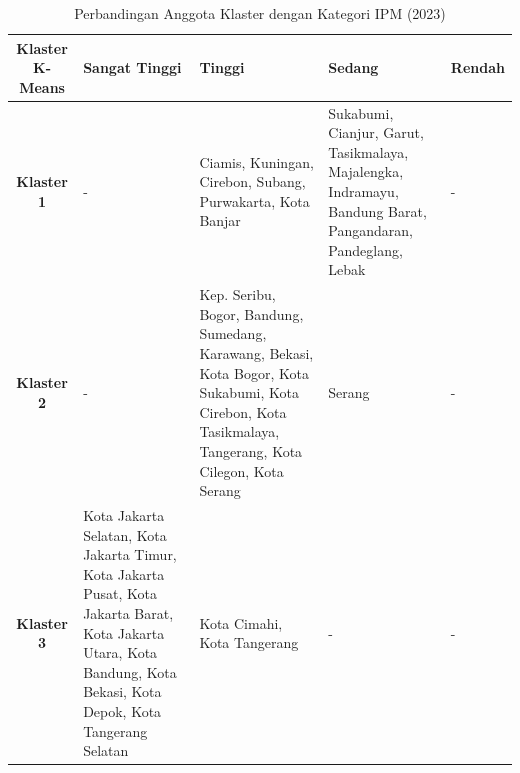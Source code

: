 \begin{table}[H]
\centering
\caption{Perbandingan Anggota Klaster dengan Kategori IPM (2023)} \label{tab:ipm_cross_2023}
\begin{tabular}{|c|p{2cm}|p{2cm}|p{2cm}|p{2cm}|}
\hline
\textbf{Klaster K-Means} & \textbf{Sangat Tinggi} & \textbf{Tinggi} & \textbf{Sedang} & \textbf{Rendah} \\ \hline
\textbf{Klaster 1} & - & Ciamis, Kuningan, Cirebon, Subang, Purwakarta, Kota Banjar & Sukabumi, Cianjur, Garut, Tasikmalaya, Majalengka, Indramayu, Bandung Barat, Pangandaran, Pandeglang, Lebak & - \\ \hline
\textbf{Klaster 2} & - & Kep. Seribu, Bogor, Bandung, Sumedang, Karawang, Bekasi, Kota Bogor, Kota Sukabumi, Kota Cirebon, Kota Tasikmalaya, Tangerang, Kota Cilegon, Kota Serang & Serang & - \\ \hline
\textbf{Klaster 3} & Kota Jakarta Selatan, Kota Jakarta Timur, Kota Jakarta Pusat, Kota Jakarta Barat, Kota Jakarta Utara, Kota Bandung, Kota Bekasi, Kota Depok, Kota Tangerang Selatan & Kota Cimahi, Kota Tangerang & - & - \\ \hline
\end{tabular}
\end{table}